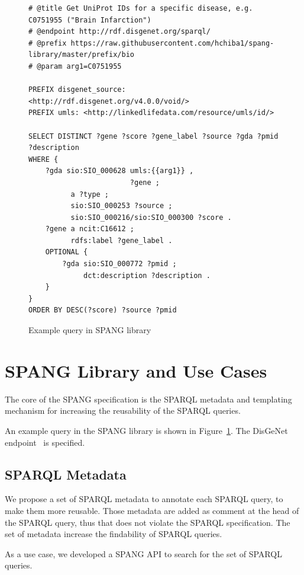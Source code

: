 \documentclass[runningheads]{llncs}
\begin{document}
\begin{figure}[!t]
\begin{scriptsize}
\begin{verbatim}
# @title Get UniProt IDs for a specific disease, e.g. C0751955 ("Brain Infarction")
# @endpoint http://rdf.disgenet.org/sparql/
# @prefix https://raw.githubusercontent.com/hchiba1/spang-library/master/prefix/bio
# @param arg1=C0751955 

PREFIX disgenet_source: <http://rdf.disgenet.org/v4.0.0/void/>
PREFIX umls: <http://linkedlifedata.com/resource/umls/id/>

SELECT DISTINCT ?gene ?score ?gene_label ?source ?gda ?pmid ?description
WHERE {
    ?gda sio:SIO_000628 umls:{{arg1}} ,
                        ?gene ;
          a ?type ;
          sio:SIO_000253 ?source ;
          sio:SIO_000216/sio:SIO_000300 ?score .
    ?gene a ncit:C16612 ;
          rdfs:label ?gene_label .
    OPTIONAL {
        ?gda sio:SIO_000772 ?pmid ;
             dct:description ?description .
    }
}
ORDER BY DESC(?score) ?source ?pmid

\end{verbatim}
\end{scriptsize}
\caption{Example query in SPANG library}
\label{fig:example-sparql}
\end{figure}

\section{SPANG Library and Use Cases}

The core of the SPANG specification is the SPARQL metadata and templating mechanism for increasing the reusability of the SPARQL queries.

An example query in the SPANG library is shown in Figure~\ref{fig:example-sparql}.
The DisGeNet endpoint~\cite{disgenet} is specified.


\subsection{SPARQL Metadata}

We propose a set of SPARQL metadata to annotate each SPARQL query, to make them more reusable.
Those metadata are added as comment at the head of the SPARQL query, thus that does not violate the SPARQL specification. 
The set of metadata increase the findability of SPARQL queries.

As a use case, we developed a SPANG API to search for the set of SPARQL queries.
\end{document}
